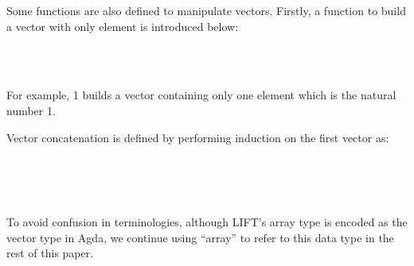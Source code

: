 \documentclass{l4proj}
\begin{document}
Some functions are also defined to manipulate vectors. Firstly, a function to build a vector with only element is introduced below:
\begin{code}%
\>[0]\<%
\\
\>[0]\AgdaOperator{\AgdaFunction{[\AgdaUnderscore{}]}}\AgdaSpace{}%
\AgdaSymbol{:}\AgdaSpace{}%
\AgdaSpace{}%
\AgdaSpace{}%
\AgdaSpace{}%
\AgdaSpace{}%
\<%
\\
\>[0]\AgdaOperator{\AgdaFunction{[}}\AgdaSpace{}%
\AgdaSpace{}%
\AgdaOperator{\AgdaFunction{]}}\AgdaSpace{}%
\AgdaSymbol{=}\AgdaSpace{}%
\AgdaSpace{}%
\AgdaSpace{}%
\AgdaInductiveConstructor{[]}\<%
\end{code}
For example, \AgdaFunction{[} 1 \AgdaFunction{]} builds a vector containing only one element which is the natural number 1.

Vector concatenation is defined by performing induction on the first vector as:
\begin{code}%
\>[0]\<%
\\
\>[0]\AgdaOperator{\AgdaFunction{\AgdaUnderscore{}++\AgdaUnderscore{}}}\AgdaSpace{}%
\AgdaSymbol{:}\AgdaSpace{}%
\AgdaSymbol{\{}\AgdaSpace{}%
\AgdaSpace{}%
\AgdaSymbol{:}\AgdaSpace{}%
\AgdaSymbol{\}}\AgdaSpace{}%
\AgdaSpace{}%
\AgdaSpace{}%
\AgdaSpace{}%
\AgdaSpace{}%
\AgdaSpace{}%
\AgdaSpace{}%
\AgdaSpace{}%
\AgdaSpace{}%
\AgdaSpace{}%
\AgdaSpace{}%
\AgdaSpace{}%
\AgdaSymbol{(}\AgdaSpace{}%
\AgdaOperator{\AgdaPrimitive{+}}\AgdaSpace{}%
\AgdaSymbol{)}\<%
\\
\>[0]\AgdaInductiveConstructor{[]}%
\>[9]\AgdaOperator{\AgdaFunction{++}}\AgdaSpace{}%
\AgdaSpace{}%
\AgdaSymbol{=}\AgdaSpace{}%
\<%
\\
\>[0]\AgdaSymbol{(}\AgdaSpace{}%
\AgdaSpace{}%
\AgdaSymbol{)}\AgdaSpace{}%
\AgdaOperator{\AgdaFunction{++}}\AgdaSpace{}%
\AgdaSpace{}%
\AgdaSymbol{=}\AgdaSpace{}%
\AgdaSpace{}%
\AgdaSpace{}%
\AgdaSymbol{(}\AgdaSpace{}%
\AgdaOperator{\AgdaFunction{++}}\AgdaSpace{}%
\AgdaSymbol{)}\<%
\end{code}
To avoid confusion in terminologies, although LIFT's array type is encoded as the vector type in Agda, we continue using ``array'' to refer to this data type in the rest of this paper.
\end{document}
